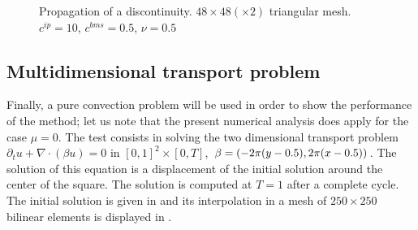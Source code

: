 \begin{figure}%
\centering
{}%
%
%
\caption{ Propagation of a discontinuity. $48\times 48(\times 2)$ triangular mesh. $c^{ip}=10$, $c^{bms} = 0.5$, $\nu=0.5$ }\label{fig-prop_disc}
\end{figure}


\subsection{Multidimensional transport problem}\label{sec-num2d}

Finally, a pure convection problem will be used in order to show the performance of the method; let us note that the present numerical analysis does apply for the case $\mu = 0$. The test consists in solving the two dimensional transport problem $\partial_t u +   \nabla \cdot (\beta u) = 0$  in $[0,1]^2 \times [0,T]$, $\beta=(-2\pi (y-0.5), 2\pi (x-0.5))$. The solution of this equation is a displacement of the initial solution around the center of the square. The solution is computed at $T=1$ after a complete cycle. The initial solution is given in \cite{dmitri_kuzmin_guide_2010} and its interpolation in a mesh of $250\times250$ bilinear elements is displayed in . 

